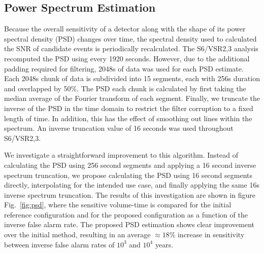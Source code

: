 
\subsection{Power Spectrum Estimation}
\label{sec:psd}

Because the overall sensitivity of a detector along with the shape of its power spectral density (PSD) changes over time, the spectral density used to calculated the SNR of candidate events is periodically recalculated. The S6/VSR2,3 analysis recomputed the PSD using every 1920 seconds. However, due to the additional padding required for filtering, 2048s of data was used for each PSD estimate. Each 2048s chunk of data is subdivided into 15 segments, each with 256s duration and overlapped by 50$\%$. The PSD each chunk is calculated by first taking the median average of the Fourier transform of each segment. Finally, we truncate the inverse of the PSD in the time domain to restrict the filter corruption to a fixed length of time. In addition, this has the effect of smoothing out lines within the spectrum. An inverse truncation value of 16 seconds was used throughout S6/VSR2,3. 

We investigate a straightforward improvement to this algorithm. Instead of calculating the PSD using 256 second segments and applying a 16 second inverse spectrum truncation, we propose calculating the PSD using 16 second segments directly, interpolating for the intended use case, and finally applying the same 16s inverse spectrum truncation. The results of this investigation are shown in figure Fig.~\ref{fig:psd}, where the sensitive volume-time is compared for the initial reference configuration and for the proposed configuration as a function of the inverse false alarm rate. The proposed PSD estimation shows clear improvement over the initial method, resulting in an average $\approx 18\%$ increase in sensitivity between inverse false alarm rates of $10^3$ and $10^4$ years.



